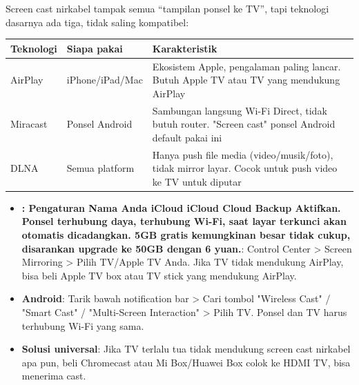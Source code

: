 


Screen cast nirkabel tampak semua “tampilan ponsel ke TV”, tapi teknologi dasarnya ada tiga, tidak saling kompatibel:

\begin{center}
\begin{tabularx}{\linewidth}{|X|X|X|}
\hline
\textbf{Teknologi} & \textbf{Siapa pakai} & \textbf{Karakteristik} \tabularnewline
\hline
AirPlay & iPhone/iPad/Mac & Ekosistem Apple, pengalaman paling lancar. Butuh Apple TV atau TV yang mendukung AirPlay \tabularnewline
Miracast & Ponsel Android & Sambungan langsung Wi-Fi Direct, tidak butuh router. "Screen cast" ponsel Android default pakai ini \tabularnewline
DLNA & Semua platform & Hanya push file media (video/musik/foto), tidak mirror layar. Cocok untuk push video ke TV untuk diputar \tabularnewline
\hline
\end{tabularx}
\end{center}


\begin{itemize}
  \item \textbf{: Pengaturan Nama Anda iCloud iCloud Cloud Backup Aktifkan. Ponsel terhubung daya, terhubung Wi-Fi, saat layar terkunci akan otomatis dicadangkan. 5GB gratis kemungkinan besar tidak cukup, disarankan upgrade ke 50GB dengan 6 yuan.}: Control Center > Screen Mirroring > Pilih TV/Apple TV Anda. Jika TV tidak mendukung AirPlay, bisa beli Apple TV box atau TV stick yang mendukung AirPlay.
  \item \textbf{Android}: Tarik bawah notification bar > Cari tombol "Wireless Cast" / "Smart Cast" / "Multi-Screen Interaction" > Pilih TV. Ponsel dan TV harus terhubung Wi-Fi yang sama.
  \item \textbf{Solusi universal}: Jika TV terlalu tua tidak mendukung screen cast nirkabel apa pun, beli Chromecast atau Mi Box/Huawei Box colok ke HDMI TV, bisa menerima cast.
\end{itemize}

